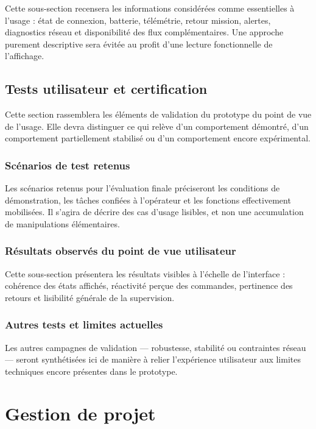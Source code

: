 \documentclass[11pt,a4paper]{report}
\begin{document}
Cette sous-section recensera les informations considérées comme essentielles à l’usage : état de connexion, batterie, télémétrie, retour mission, alertes, diagnostics réseau et disponibilité des flux complémentaires. Une approche purement descriptive sera évitée au profit d’une lecture fonctionnelle de l’affichage.

\section{Tests utilisateur et certification}

Cette section rassemblera les éléments de validation du prototype du point de vue de l’usage. Elle devra distinguer ce qui relève d’un comportement démontré, d’un comportement partiellement stabilisé ou d’un comportement encore expérimental.

\subsection{Scénarios de test retenus}

Les scénarios retenus pour l’évaluation finale préciseront les conditions de démonstration, les tâches confiées à l’opérateur et les fonctions effectivement mobilisées. Il s’agira de décrire des cas d’usage lisibles, et non une accumulation de manipulations élémentaires.

\subsection{Résultats observés du point de vue utilisateur}

Cette sous-section présentera les résultats visibles à l’échelle de l’interface : cohérence des états affichés, réactivité perçue des commandes, pertinence des retours et lisibilité générale de la supervision.

\subsection{Autres tests et limites actuelles}

Les autres campagnes de validation --- robustesse, stabilité ou contraintes réseau --- seront synthétisées ici de manière à relier l’expérience utilisateur aux limites techniques encore présentes dans le prototype.

\chapter{Gestion de projet}
\end{document}
